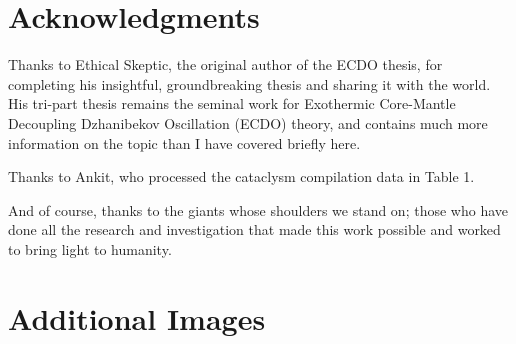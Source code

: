 \documentclass[10pt,twocolumn,letterpaper]{article}
\begin{document}
\section{Acknowledgments}

Thanks to Ethical Skeptic, the original author of the ECDO thesis, for completing his insightful, groundbreaking thesis and sharing it with the world. His tri-part thesis \cite{1} remains the seminal work for Exothermic Core-Mantle Decoupling Dzhanibekov Oscillation (ECDO) theory, and contains much more information on the topic than I have covered briefly here.

Thanks to Ankit, who processed the cataclysm compilation data in Table 1.

And of course, thanks to the giants whose shoulders we stand on; those who have done all the research and investigation that made this work possible and worked to bring light to humanity.

\clearpage
\twocolumn

\section{Additional Images}



\end{document}
